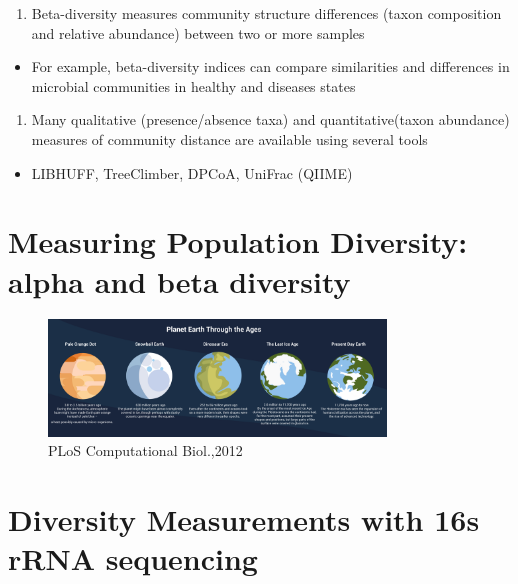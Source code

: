 \documentclass[
]{book}
\providecommand{\tightlist}{%
  \setlength{\itemsep}{0pt}\setlength{\parskip}{0pt}}
\begin{document}
\begin{enumerate}
\def\labelenumi{\arabic{enumi}.}
\tightlist
\item
  Beta-diversity measures community structure differences (taxon composition and relative abundance) between two or more samples
\end{enumerate}

\begin{itemize}
\tightlist
\item
  For example, beta-diversity indices can compare similarities and differences in microbial communities in healthy and diseases states
\end{itemize}

\begin{enumerate}
\def\labelenumi{\arabic{enumi}.}
\setcounter{enumi}{1}
\tightlist
\item
  Many qualitative (presence/absence taxa) and
  quantitative(taxon abundance) measures of community
  distance are available using several tools
\end{enumerate}

\begin{itemize}
\tightlist
\item
  LIBHUFF, TreeClimber, DPCoA, UniFrac (QIIME)
\end{itemize}

\hypertarget{measuring-population-diversity-alpha-and-beta-diversity}{%
\section{\texorpdfstring{Measuring Population Diversity: \textbf{alpha and beta diversity}}{Measuring Population Diversity: alpha and beta diversity}}\label{measuring-population-diversity-alpha-and-beta-diversity}}

\begin{figure}
\centering
\includegraphics[width=0.8\textwidth,height=\textheight]{./Figures/Planets.png}
\caption{PLoS Computational Biol.,2012}
\end{figure}

\hypertarget{diversity-measurements-with-16s-rrna-sequencing}{%
\section{Diversity Measurements with 16s rRNA sequencing}\label{diversity-measurements-with-16s-rrna-sequencing}}
\end{document}
